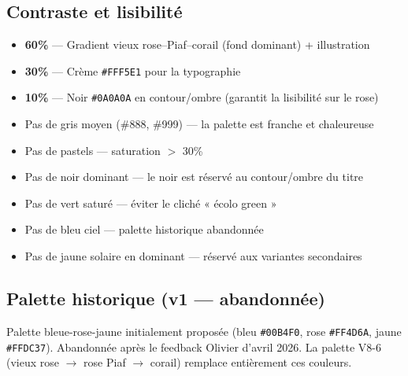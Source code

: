 \documentclass[a4paper,11pt]{article}
\begin{document}
\subsection{Contraste et lisibilité}

\begin{tcolorbox}[highlight card, title=Ratio 60-30-10]
\begin{itemize}[nosep]
  \item \textbf{60\%} — Gradient vieux rose–Piaf–corail (fond dominant) + illustration
  \item \textbf{30\%} — Crème \texttt{\#FFF5E1} pour la typographie
  \item \textbf{10\%} — Noir \texttt{\#0A0A0A} en contour/ombre (garantit la lisibilité sur le rose)
\end{itemize}
\end{tcolorbox}

\begin{tcolorbox}[card, title=Interdits, colframe=consoPiaf!30]
\begin{itemize}[nosep]
  \item Pas de gris moyen (\#888, \#999) — la palette est franche et chaleureuse
  \item Pas de pastels — saturation $>$ 30\%
  \item Pas de noir dominant — le noir est réservé au contour/ombre du titre
  \item Pas de vert saturé — éviter le cliché « écolo green »
  \item Pas de bleu ciel — palette historique abandonnée
  \item Pas de jaune solaire en dominant — réservé aux variantes secondaires
\end{itemize}
\end{tcolorbox}

\subsection{Palette historique (v1 — abandonnée)}

\begin{tcolorbox}[card]
Palette bleue-rose-jaune initialement proposée (bleu \texttt{\#00B4F0}, rose \texttt{\#FF4D6A}, jaune \texttt{\#FFDC37}). Abandonnée après le feedback Olivier d'avril 2026. La palette V8-6 (vieux rose $\rightarrow$ rose Piaf $\rightarrow$ corail) remplace entièrement ces couleurs.
\end{tcolorbox}

\newpage
\end{document}
